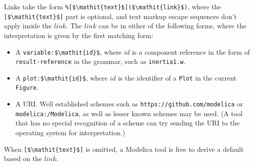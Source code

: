 Links take the form \lstinline!%[$\mathit{text}$]($\mathit{link}$)!, where the \lstinline![$\mathit{text}$]! part is optional, and text markup escape sequences don't apply inside the $\mathit{link}$.
The $\mathit{link}$ can be in either of the following forms, where the interpretation is given by the first matching form:
\begin{itemize}
\item
A \lstinline!variable:$\mathit{id}$!, where $\mathit{id}$ is a component reference in the form of \lstinline[language=grammar]!result-reference! in the grammar, such as \lstinline!inertia1.w!.
\item
A \lstinline!plot:$\mathit{id}$!, where $\mathit{id}$ is the identifier of a \lstinline!Plot! in the current \lstinline!Figure!.
\item
A URI.
Well established schemes such as \lstinline[language={[nocomment]modelica}]!https://github.com/modelica! or \lstinline[language={[nocomment]modelica}]!modelica:/Modelica!, as well as lesser known schemes may be used.
(A tool that has no special recognition of a scheme can try sending the URI to the operating system for interpretation.)
\end{itemize}

When \lstinline![$\mathit{text}$]! is omitted, a Modelica tool is free to derive a default based on the $\mathit{link}$.

